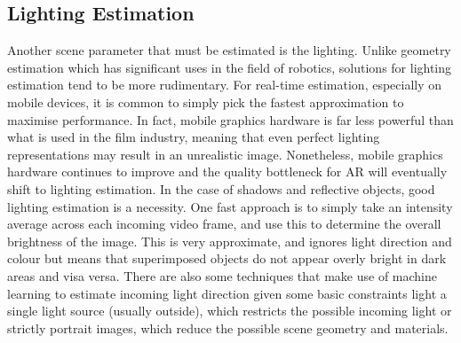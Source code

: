 \documentclass[ %
                    author={Gavin Parker},
                supervisor={Dr. Neill Campbell},
                    degree={MEng},
                     title={Deep Siamese Networks for Illumination Estimation from Stereo Images},
                  subtitle={},
                      type={research},
                      year={2018} ]{dissertation}
\begin{document}
\subsection{Lighting Estimation}
Another scene parameter that must be estimated is the lighting. Unlike geometry estimation which has significant uses in the field of robotics, solutions for lighting estimation tend to be more rudimentary. For real-time estimation, especially on mobile devices, it is common to simply pick the fastest approximation to maximise performance. In fact, mobile graphics hardware is far less powerful than what is used in the film industry, meaning that even perfect lighting representations may result in an unrealistic image. Nonetheless, mobile graphics hardware continues to improve and the quality bottleneck for AR will eventually shift to lighting estimation. In the case of shadows and reflective objects, good lighting estimation is a necessity. One fast approach is to simply take an intensity average across each incoming video frame, and use this to determine the overall brightness of the image. This is very approximate, and ignores light direction and colour but means that superimposed objects do not appear overly bright in dark areas and visa versa. There are also some techniques that make use of machine learning to estimate incoming light direction given some basic constraints light a single light source (usually outside), which restricts the possible incoming light or strictly portrait images, which reduce the possible scene geometry and materials.
\end{document}
